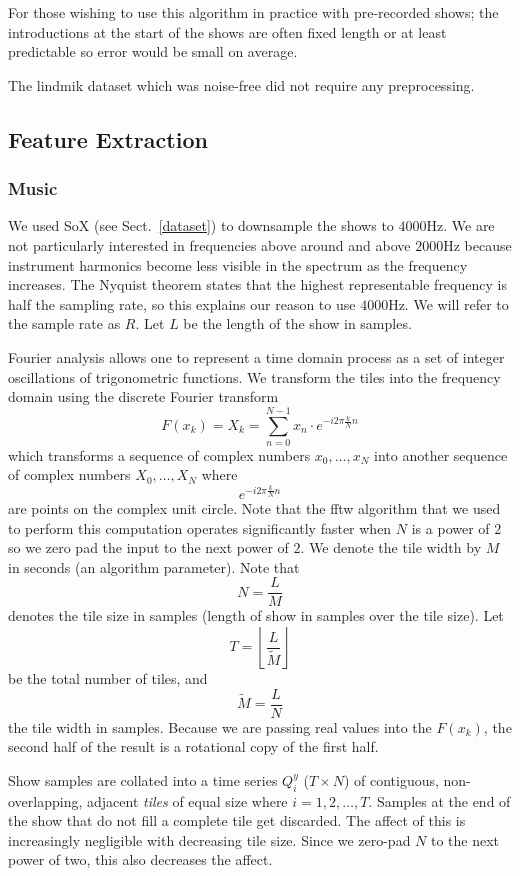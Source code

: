 \documentclass[twocolumn]{article}
\begin{document}
	For those wishing to use this algorithm in practice with pre-recorded shows; the introductions at the start of the shows are often fixed length or at least predictable so error would be small on average.
	
	The lindmik dataset which was noise-free did not require any preprocessing. 
	
	\subsection{Feature Extraction}
	
	\subsubsection{Music}\label{feat_ex} %
	
	We used SoX (see Sect.~\ref{dataset}) to downsample the shows to $4000$Hz. We are not particularly interested in frequencies above around and above $2000$Hz because instrument harmonics become less visible in the spectrum as the frequency increases. The Nyquist theorem \cite{nyquist1928certain} states that the highest representable frequency is half the sampling rate, so this explains our reason to use $4000$Hz. We will refer to the sample rate as $R$. Let $L$ be the length of the show in samples.
	
	Fourier analysis allows one to represent a time domain process as a set of integer oscillations of trigonometric functions. We transform the tiles into the frequency domain using the discrete Fourier transform
\[
F(x_k) = X_k = \sum_{n=0}^{N-1} x_n \cdot e^{-i 2 \pi \frac{k}{N} n}
\] which transforms a sequence of complex numbers $x_0,\ldots,x_N$ into another sequence of complex numbers $X_0,\ldots,X_N$ where $$e^{-i 2 \pi \frac{k}{N} n}$$ are points on the complex unit circle. Note that the fftw algorithm \cite{frigo2004fftw} that we used to perform this computation operates significantly faster when $N$ is a power of $2$ so we zero pad the input to the next power of $2$. We denote the tile width by $M$ in seconds (an algorithm parameter). Note that
\[
N = \frac{L}{M}
\] denotes the tile size in samples (length of show in samples over the tile size). Let 
\[
T = \left\lfloor\frac{L}{\tilde{M}}\right\rfloor
\] be the total number of tiles, and \[
\tilde{M}=\frac{L}{N}
\] the tile width in samples.
Because we are passing real values into the $F(x_k)$, the second half of the result is a rotational copy of the first half.
	
	Show samples are collated into a time series $Q_i^y$ ($T \times N$) of contiguous, non-overlapping, adjacent \emph{tiles} of equal size where $i=1,2,\ldots, T$. Samples at the end of the show that do not fill a complete tile get discarded. The affect of this is increasingly negligible with decreasing tile size. Since we zero-pad $N$ to the next power of two, this also decreases the affect.
	
\end{document}

